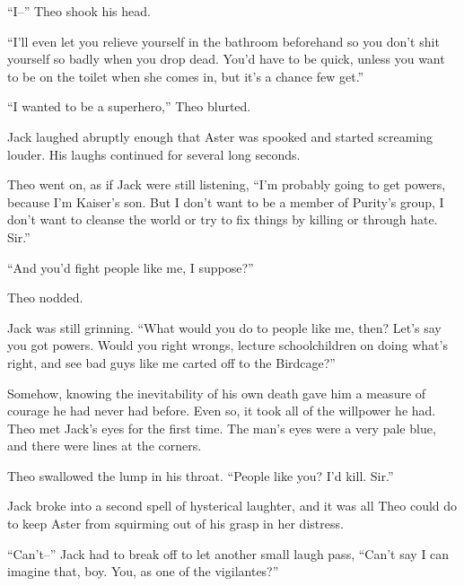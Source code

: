 ``I--''  Theo shook his head.



``I'll even let you relieve yourself in the bathroom beforehand so you don't shit yourself so badly when you drop dead.  You'd have to be quick, unless you want to be on the toilet when she comes in, but it's a chance few get.''



``I wanted to be a superhero,'' Theo blurted.



Jack laughed abruptly enough that Aster was spooked and started screaming louder.  His laughs continued for several long seconds.



Theo went on, as if Jack were still listening, ``I'm probably going to get powers, because I'm Kaiser's son.  But I don't want to be a member of Purity's group, I don't want to cleanse the world or try to fix things by killing or through hate.  Sir.''



``And you'd fight people like me, I suppose?''



Theo nodded.



Jack was still grinning.  ``What would you do to people like me, then?  Let's say you got powers.  Would you right wrongs, lecture schoolchildren on doing what's right, and see bad guys like me carted off to the Birdcage?''



Somehow, knowing the inevitability of his own death gave him a measure of courage he had never had before.  Even so, it took all of the willpower he had.  Theo met Jack's eyes for the first time.  The man's eyes were a very pale blue, and there were lines at the corners.



Theo swallowed the lump in his throat.  ``People like you?  I'd kill.  Sir.''



Jack broke into a second spell of hysterical laughter, and it was all Theo could do to keep Aster from squirming out of his grasp in her distress.



``Can't--'' Jack had to break off to let another small laugh pass, ``Can't say I can imagine that, boy.  You, as one of the vigilantes?''



